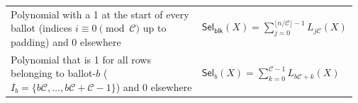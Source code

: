 \begin{table}[t]
\begin{tabular}{@{}p{0.58\linewidth}|p{0.39\linewidth}@{}}
Polynomial with a 1 at the start of every ballot (indices $i\equiv 0\!\!\pmod{\mathcal{C}}$ up to padding) and 0 elsewhere&
$\mathsf{Sel}_{\mathsf{blk}}(X)=\displaystyle\sum_{j=0}^{\lfloor n/\mathcal{C}\rfloor-1} L_{j\mathcal{C}}(X)$ \\

Polynomial that is 1 for all rows belonging to ballot-$b$ ($I_b=\{b\mathcal{C},\dots,b\mathcal{C}+\mathcal{C}-1\}$) and 0 elsewhere &
$\mathsf{Sel}_{b}(X)=\displaystyle\sum_{k=0}^{\mathcal{C}-1} L_{b\mathcal{C}+k}(X)$ \\



\bottomrule
\end{tabular}
\end{table}





